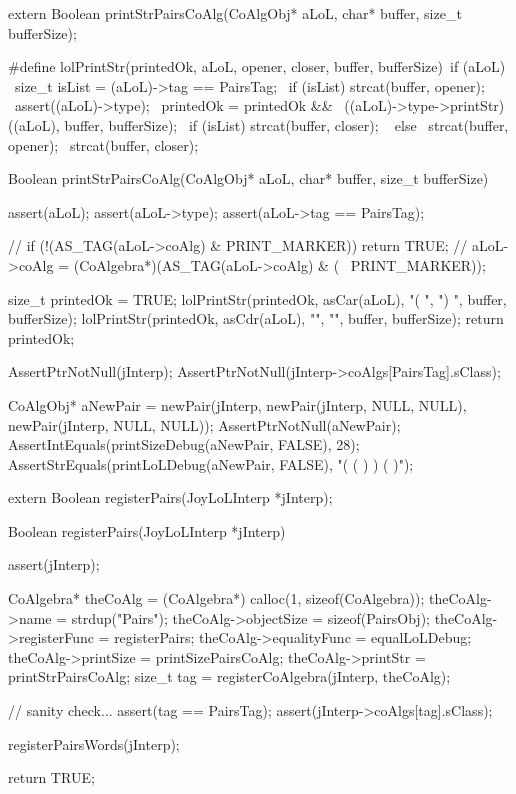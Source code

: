 \startCHeader
extern Boolean printStrPairsCoAlg(CoAlgObj* aLoL,
                                  char* buffer, size_t bufferSize);
\stopCHeader

\startCCode
#define lolPrintStr(printedOk, aLoL, opener, closer, buffer, bufferSize)\
  if (aLoL) {								                                            \
    size_t isList = (aLoL)->tag == PairsTag;        			              \
    if (isList) strcat(buffer, opener);					                        \
    assert((aLoL)->type);						                                    \
    printedOk = printedOk && 						                                \
      ((aLoL)->type->printStr)((aLoL), buffer, bufferSize);		          \
    if (isList) strcat(buffer, closer);					                        \
  } else {								                                              \
    strcat(buffer, opener);						                                  \
    strcat(buffer, closer);						                                  \
  }
  
Boolean printStrPairsCoAlg(CoAlgObj* aLoL,
                           char* buffer, size_t bufferSize) {
  assert(aLoL);
  assert(aLoL->type);
  assert(aLoL->tag == PairsTag);

//  if (!(AS_TAG(aLoL->coAlg) & PRINT_MARKER)) return TRUE;
//  aLoL->coAlg = (CoAlgebra*)(AS_TAG(aLoL->coAlg) & (~ PRINT_MARKER));

  size_t printedOk = TRUE;
  lolPrintStr(printedOk, asCar(aLoL), "( ", ") ", buffer, bufferSize);
  lolPrintStr(printedOk, asCdr(aLoL), "",   "",   buffer, bufferSize);
  return printedOk;
}
\stopCCode


\startCTest
  AssertPtrNotNull(jInterp);
  AssertPtrNotNull(jInterp->coAlgs[PairsTag].sClass);

  CoAlgObj* aNewPair = newPair(jInterp,
                               newPair(jInterp, NULL, NULL),
                               newPair(jInterp, NULL, NULL));
  AssertPtrNotNull(aNewPair);
  AssertIntEquals(printSizeDebug(aNewPair, FALSE), 28);
  AssertStrEquals(printLoLDebug(aNewPair, FALSE), "( ( ) ) ( )");
\stopCTest
\stopTestCase
\stopTestSuite

\startTestSuite[registerPairs]

\startCHeader
extern Boolean registerPairs(JoyLoLInterp *jInterp);
\stopCHeader
\setCHeaderStream{public}

\startCCode
Boolean registerPairs(JoyLoLInterp *jInterp) {
  assert(jInterp);
  
  CoAlgebra* theCoAlg    = (CoAlgebra*) calloc(1, sizeof(CoAlgebra));
  theCoAlg->name         = strdup("Pairs");
  theCoAlg->objectSize   = sizeof(PairsObj);
  theCoAlg->registerFunc = registerPairs;
  theCoAlg->equalityFunc = equalLoLDebug;
  theCoAlg->printSize    = printSizePairsCoAlg;
  theCoAlg->printStr     = printStrPairsCoAlg;
  size_t tag = registerCoAlgebra(jInterp, theCoAlg);
  
  // sanity check...
  assert(tag == PairsTag);
  assert(jInterp->coAlgs[tag].sClass);
    
  registerPairsWords(jInterp);
  
  return TRUE;
}
\stopCCode

